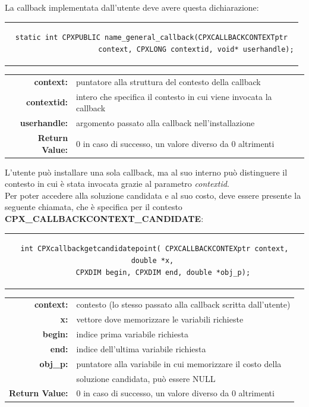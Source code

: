 La callback implementata dall'utente deve avere questa dichiarazione:
\begin{center}
\begin{tabular}{c}
\begin{lstlisting}[linewidth=350pt, basicstyle=\footnotesize\sffamily,]    
static int CPXPUBLIC name_general_callback(CPXCALLBACKCONTEXTptr
                     context, CPXLONG contextid, void* userhandle);
\end{lstlisting}
\end{tabular}
\end{center}
\begin{table}[h]
\centering
\begin{tabular}{rl}
\textbf{context:} & {puntatore alla struttura del contesto della callback}\\
\textbf{contextid:} & {intero che specifica il contesto in cui viene invocata la callback}\\
\textbf{userhandle:} & {argomento passato alla callback nell'installazione}\\
\textbf{Return Value:} & {0 in caso di successo, un valore diverso da 0 altrimenti}\\
\end{tabular}
\end{table}
L'utente può installare una sola callback, ma al suo interno può distinguere il contesto in cui è stata invocata grazie al parametro \textit{contextid}.\\
Per poter accedere alla soluzione candidata e al suo costo, deve essere presente la seguente chiamata, che è specifica per il contesto \textbf{CPX\_CALLBACKCONTEXT\_CANDIDATE}:
\begin{center}
\begin{tabular}{c}
\begin{lstlisting}[linewidth=380pt, basicstyle=\footnotesize\sffamily,]
int CPXcallbackgetcandidatepoint( CPXCALLBACKCONTEXptr context, double *x, 
		CPXDIM begin, CPXDIM end, double *obj_p);    
\end{lstlisting}
\vspace{0.2 cm}
\end{tabular}
\end{center}
\begin{table}[h]
\centering
\begin{tabular}{rl}
\textbf{context:} & {contesto (lo stesso passato alla callback scritta dall'utente)}\\
\textbf{x:} & {vettore dove memorizzare le variabili richieste}\\
\textbf{begin:} & {indice prima variabile richiesta}\\
\textbf{end:} & {indice dell'ultima variabile richiesta}\\
\textbf{obj\_p:} & {puntatore alla variabile in cui memorizzare il costo della}\\
&{soluzione candidata, può essere NULL}\\
\textbf{Return Value:} & {0 in caso di successo, un valore diverso da 0 altrimenti}\\
\end{tabular}
\end{table}
